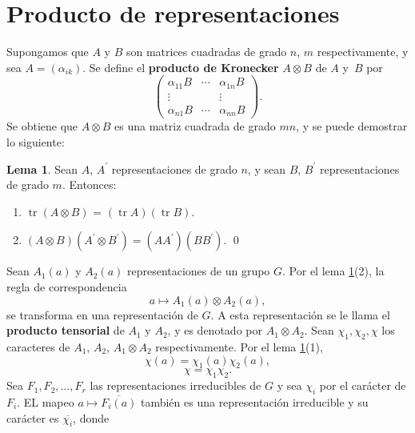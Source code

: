 \documentclass[12pt]{book}
\DeclareMathOperator{\tr}{tr}
\theoremstyle{definition}
\newtheorem{lemma}[theorem]{Lema}
\newcounter{in}
\begin{document}
\section{Producto de representaciones}
\label{sec:pr}
Supongamos que $A$ y $B$ son matrices cuadradas de grado $n$, $m$
respectivamente, y sea $A=(\alpha_{ik})$. Se define el
\textbf{producto de Kronecker} $A \otimes B$ de $A$ y~$B$ por
\begin{equation}
  \label{eq:65}
    \begin{pmatrix}
    \alpha_{11}B & \cdots & \alpha_{1n}B \\ 
    \vdots &  & \vdots \\
    \alpha_{n1}B & \cdots & \alpha_{nn}B
  \end{pmatrix}.
\end{equation}
Se obtiene que $A \otimes B$ es una matriz cuadrada de grado $mn$, y se
puede demostrar lo siguiente:
\begin{lemma}
  \label{l6_1}
  Sean $A$, $A^{'}$ representaciones de grado $n$, y sean $B$, $B^{'}$
  representaciones de grado $m$. Entonces:
  \begin{enumerate}
  \item $\tr(A \otimes B)$ = $(\tr A)(\tr B)$.
  \item $(A \otimes B)(A^{'} \otimes B^{'}) = (AA^{'})(BB^{'})$. \qed
  \end{enumerate}
\end{lemma}
Sean $A_{1}(a)$ y $A_{2}(a)$ representaciones de un grupo $G$. Por el lema
\ref{l6_1}(2), la regla de correspondencia
\begin{equation*}
  a \mapsto A_{1}(a) \otimes A_{2}(a),
\end{equation*}
se transforma en una representación de $G$. A esta representación se
le llama el \textbf{producto tensorial} de $A_{1}$ y $A_{2}$, y es denotado por
$A_{1} \otimes A_{2}$. Sean $\chi_{1}, \chi_2, \chi$ los caracteres de
$A_{1}$, $A_{2}$, $A_{1} \otimes A_{2}$ respectivamente. Por el lema
\ref{l6_1}(1),
\begin{equation*}
  \chi(a)=\chi_{1}(a) \chi_{2}(a),
\end{equation*}
\begin{equation}
  \label{eq:67}
  \chi = \chi_{1} \chi_{2}.
\end{equation}
Sea $F_{1}, F_{2}, \ldots, F_{r}$ las representaciones irreducibles de
$G$ y sea $\chi_{i}$ por el carácter de $F_{i}$. EL mapeo
$a \mapsto \overline{F_{i}(a)}$ también es una representación
irreducible y su carácter es $\overline{\chi_{i}}$, donde
\end{document}

